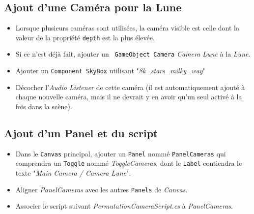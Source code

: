 \documentclass[a4paper,10pt]{article}
\newenvironment{solution}%
{\begin{tcolorbox}[breakable,colback=red!5!white,colframe=red!75!black,title=Solution]}%
{\end{tcolorbox}}
\begin{document}
\ifversionenseignant
\begin{solution}
\subsection{Ajout d'une Caméra pour la Lune}

\begin{itemize}
	\item Lorsque plusieurs caméras sont utilisées, la caméra visible est celle dont la valeur de la propriété \texttt{depth} est la plus élevée.
	\item Si ce n'est déjà fait, ajouter un \texttt{ GameObject Camera} \textit{Camera Lune} à la \textit{Lune}.
	\item Ajouter un \texttt{Component SkyBox} utilisant "\textit{8k\_stars\_milky\_way}"
	\item Décocher l'\textit{Audio Listener} de cette caméra (il est automatiquement ajouté à chaque nouvelle caméra, mais il ne devrait y en avoir qu'un seul activé à la fois dans la scène).
\end{itemize}	

	
\subsection{Ajout d'un Panel et du script}
\begin{itemize}
	\item Dans le \texttt{Canvas} principal, ajouter un \texttt{Panel} nommé \texttt{PanelCameras} qui comprendra un \texttt{Toggle} nommé \textit{ToggleCameras}, dont le \texttt{Label} contiendra le texte "\textit{Main Camera / Camera Lune}".
	\item Aligner \textit{PanelCameras} avec les autres \texttt{Panels} de \textit{Canvas}.
	\item Associer le script suivant \textit{PermutationCameraScript.cs} à \textit{PanelCameras}.
\end{itemize}	


\end{solution}
\end{document}

